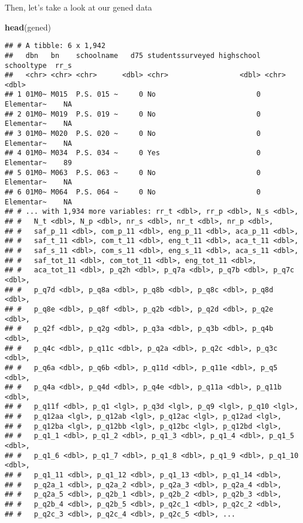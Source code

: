 \documentclass[]{article}
\newenvironment{Shaded}{\begin{snugshade}}{\end{snugshade}}
\newcommand{\KeywordTok}[1]{\textcolor[rgb]{0.13,0.29,0.53}{\textbf{#1}}}
\newcommand{\NormalTok}[1]{#1}
\begin{document}
Then, let's take a look at our gened data

\begin{Shaded}
\begin{Highlighting}[]
\KeywordTok{head}\NormalTok{(gened)}
\end{Highlighting}
\end{Shaded}

\begin{verbatim}
## # A tibble: 6 x 1,942
##   dbn   bn    schoolname   d75 studentssurveyed highschool schooltype  rr_s
##   <chr> <chr> <chr>      <dbl> <chr>                 <dbl> <chr>      <dbl>
## 1 01M0~ M015  P.S. 015 ~     0 No                        0 Elementar~    NA
## 2 01M0~ M019  P.S. 019 ~     0 No                        0 Elementar~    NA
## 3 01M0~ M020  P.S. 020 ~     0 No                        0 Elementar~    NA
## 4 01M0~ M034  P.S. 034 ~     0 Yes                       0 Elementar~    89
## 5 01M0~ M063  P.S. 063 ~     0 No                        0 Elementar~    NA
## 6 01M0~ M064  P.S. 064 ~     0 No                        0 Elementar~    NA
## # ... with 1,934 more variables: rr_t <dbl>, rr_p <dbl>, N_s <dbl>,
## #   N_t <dbl>, N_p <dbl>, nr_s <dbl>, nr_t <dbl>, nr_p <dbl>,
## #   saf_p_11 <dbl>, com_p_11 <dbl>, eng_p_11 <dbl>, aca_p_11 <dbl>,
## #   saf_t_11 <dbl>, com_t_11 <dbl>, eng_t_11 <dbl>, aca_t_11 <dbl>,
## #   saf_s_11 <dbl>, com_s_11 <dbl>, eng_s_11 <dbl>, aca_s_11 <dbl>,
## #   saf_tot_11 <dbl>, com_tot_11 <dbl>, eng_tot_11 <dbl>,
## #   aca_tot_11 <dbl>, p_q2h <dbl>, p_q7a <dbl>, p_q7b <dbl>, p_q7c <dbl>,
## #   p_q7d <dbl>, p_q8a <dbl>, p_q8b <dbl>, p_q8c <dbl>, p_q8d <dbl>,
## #   p_q8e <dbl>, p_q8f <dbl>, p_q2b <dbl>, p_q2d <dbl>, p_q2e <dbl>,
## #   p_q2f <dbl>, p_q2g <dbl>, p_q3a <dbl>, p_q3b <dbl>, p_q4b <dbl>,
## #   p_q4c <dbl>, p_q11c <dbl>, p_q2a <dbl>, p_q2c <dbl>, p_q3c <dbl>,
## #   p_q6a <dbl>, p_q6b <dbl>, p_q11d <dbl>, p_q11e <dbl>, p_q5 <dbl>,
## #   p_q4a <dbl>, p_q4d <dbl>, p_q4e <dbl>, p_q11a <dbl>, p_q11b <dbl>,
## #   p_q11f <dbl>, p_q1 <lgl>, p_q3d <lgl>, p_q9 <lgl>, p_q10 <lgl>,
## #   p_q12aa <lgl>, p_q12ab <lgl>, p_q12ac <lgl>, p_q12ad <lgl>,
## #   p_q12ba <lgl>, p_q12bb <lgl>, p_q12bc <lgl>, p_q12bd <lgl>,
## #   p_q1_1 <dbl>, p_q1_2 <dbl>, p_q1_3 <dbl>, p_q1_4 <dbl>, p_q1_5 <dbl>,
## #   p_q1_6 <dbl>, p_q1_7 <dbl>, p_q1_8 <dbl>, p_q1_9 <dbl>, p_q1_10 <dbl>,
## #   p_q1_11 <dbl>, p_q1_12 <dbl>, p_q1_13 <dbl>, p_q1_14 <dbl>,
## #   p_q2a_1 <dbl>, p_q2a_2 <dbl>, p_q2a_3 <dbl>, p_q2a_4 <dbl>,
## #   p_q2a_5 <dbl>, p_q2b_1 <dbl>, p_q2b_2 <dbl>, p_q2b_3 <dbl>,
## #   p_q2b_4 <dbl>, p_q2b_5 <dbl>, p_q2c_1 <dbl>, p_q2c_2 <dbl>,
## #   p_q2c_3 <dbl>, p_q2c_4 <dbl>, p_q2c_5 <dbl>, ...
\end{verbatim}
\end{document}

